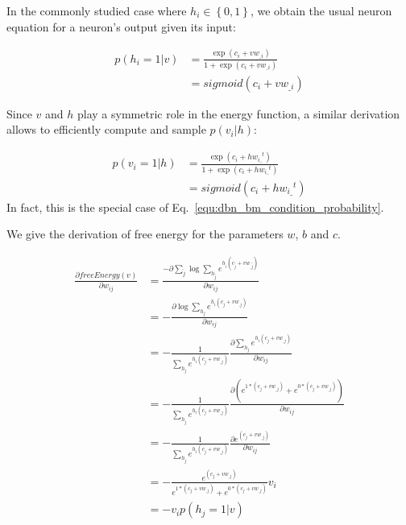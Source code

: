 \documentclass[runningheads,openany]{xhlPaper}
\begin{document}
In the commonly studied case where ${h_i} \in \left\{ {0,1} \right\}$, we obtain the usual neuron equation for a neuron's output given its input:

\begin{equation}
\label{equ:dbn_rbm_hidden_sigmoid}
\begin{aligned}
p\left( {{h_i} = 1|v} \right) &= \frac{{\exp \left( {{c_i} + v{w_{\_i}}} \right)}}{{1 + \exp \left( {{c_i} + v{w_{\_i}}} \right)}}\\
 &= sigmoid\left( {{c_i} + v{w_{\_i}}} \right)
\end{aligned}
\end{equation}

Since $v$ and $h$ play a symmetric role in the energy function, a similar derivation allows to efficiently compute and sample $p\left(v_{i}|h\right)$:

\begin{displaymath}
\label{equ:dbn_rbm_visible_sigmoid}
\begin{aligned}
p\left( {{v_i} = 1|h} \right) &= \frac{{\exp \left( {{c_i} + h{w_{i\_}}^t} \right)}}{{1 + \exp \left( {{c_i} + h{w_{i\_}}^t} \right)}}\\
 &= sigmoid\left( {{c_i} + h{w_{i\_}}^t} \right)
\end{aligned}
\end{displaymath}
In fact, this is the special case of Eq.~\ref{equ:dbn_bm_condition_probability}.

We give the derivation of free energy for the parameters $w$, $b$ and $c$.

\begin{equation}
\label{equ:dbn_rbm_free_energy_derivation_for_weight}
\begin{aligned}
\frac{{\partial freeEnergy\left( v \right)}}{{\partial {w_{ij}}}} &= \frac{{ - \partial \sum\limits_{\hat j} {\log \sum\limits_{{h_{\hat j}}} {{e^{{h_{\hat i}}\left( {{c_{\hat j}} + v{w_{\_\hat j}}} \right)}}} } }}{{\partial {w_{ij}}}}\\
 &=  - \frac{{\partial \log \sum\limits_{{h_j}} {{e^{{h_i}\left( {{c_j} + v{w_{\_j}}} \right)}}} }}{{\partial {w_{ij}}}}\\
 &=  - \frac{1}{{\sum\limits_{{h_j}} {{e^{{h_i}\left( {{c_j} + v{w_{\_j}}} \right)}}} }}\frac{{\partial \sum\limits_{{h_j}} {{e^{{h_i}\left( {{c_j} + v{w_{\_j}}} \right)}}} }}{{\partial {w_{ij}}}}\\
 &=  - \frac{1}{{\sum\limits_{{h_j}} {{e^{{h_i}\left( {{c_j} + v{w_{\_j}}} \right)}}} }}\frac{{\partial \left( {{e^{1*\left( {{c_j} + v{w_{\_j}}} \right)}} + {e^{0*\left( {{c_j} + v{w_{\_j}}} \right)}}} \right)}}{{\partial {w_{ij}}}}\\
 &=  - \frac{1}{{\sum\limits_{{h_j}} {{e^{{h_i}\left( {{c_j} + v{w_{\_j}}} \right)}}} }}\frac{{\partial {e^{\left( {{c_j} + v{w_{\_j}}} \right)}}}}{{\partial {w_{ij}}}}\\
 &=  - \frac{{{e^{\left( {{c_j} + v{w_{\_j}}} \right)}}}}{{{e^{1*\left( {{c_j} + v{w_{\_j}}} \right)}} + {e^{0*\left( {{c_j} + v{w_{\_j}}} \right)}}}}{v_i}\\
 &=  - {v_i}p\left( {{h_j} = 1|v} \right)
\end{aligned}
\end{equation}
\end{document}
